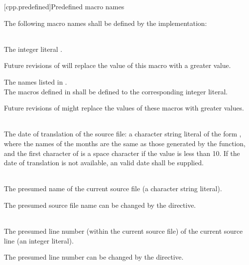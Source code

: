 [cpp.predefined]{Predefined macro names}
%

\pnum
The following macro names shall be defined by the implementation:
\begin{description}

\item
{}%
\\
The integer literal \tcode{\cppver}.
\begin{note}
Future revisions of \Cpp{} will
replace the value of this macro with a greater value.
\end{note}

\item The names listed in .\\
The macros defined in  shall be defined to
the corresponding integer literal.
\begin{note}
Future revisions of \Cpp{} might replace
the values of these macros with greater values.
\end{note}

\item
{}%
\\
The date of translation of the source file:
a character string literal of the form
,
where the names of the months are the same as those generated
by the
function,
and the first character of
is a space character if the value is less than 10.
If the date of translation is not available,
an  valid date
shall be supplied.

\item
{}%
\\
The presumed name of the current source file (a character string
literal).
\begin{footnote}
The presumed source file name can be changed by the  directive.
\end{footnote}

\item
{}%
\\
The presumed line number (within the current source file) of the current source line
(an integer literal).
\begin{footnote}
The presumed line number can be changed by the  directive.
\end{footnote}


\end{description}

